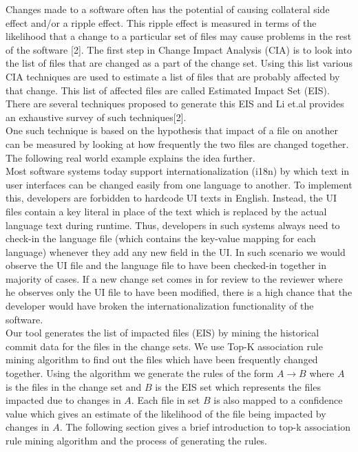 Changes made to a software often has the potential of causing collateral side effect and/or a ripple effect. This ripple effect is measured in terms of the likelihood that a change to a particular set of files may cause problems in the rest of the software [2]. The first step in Change Impact Analysis (CIA) is to look into the list of files that are changed as a part of the change set. Using this list various CIA techniques are used to estimate a list of files that are probably affected by that change. This list of affected files are called Estimated Impact Set (EIS). There are several techniques proposed to generate this EIS and Li et.al provides an exhaustive survey of such techniques[2].\\
One such technique is based on the hypothesis that impact of a file on another can be measured by looking at how frequently the two files are changed together. The following real world example explains the idea further.\\
Most software systems today support internationalization (i18n) by which text in user interfaces can be changed easily from one language to another. To implement this, developers are forbidden to hardcode UI texts in English. Instead, the UI files contain a key literal in place of the text which is replaced by the actual language text during runtime. Thus, developers in such systems always need to check-in the language file (which contains the key-value mapping for each language) whenever they add any new field in the UI. In such scenario we would observe the UI file and the language file to have been checked-in together in majority of cases. If a new change set comes in for review to the reviewer where he observes only the UI file to have been modified, there is a high chance that the developer would have broken the internationalization functionality of the software.\\
Our tool generates the list of impacted files (EIS) by mining the historical commit data for the files in the change sets. We use Top-K association rule mining algorithm to find out the files which have been frequently changed together. Using the algorithm we generate the rules of the form $A \rightarrow B$ where $A$ is the files in the change set and $B$ is the EIS set which represents the files impacted due to changes in $A$. Each file in set $B$ is also mapped to a confidence value which gives an estimate of the likelihood of the file being impacted by changes in $A$. The following section gives a brief introduction to top-k association rule mining algorithm and the process of generating the rules.\\  

